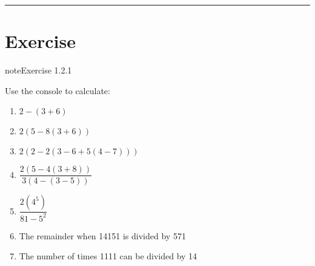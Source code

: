 \documentclass[letterpaper,10pt,english]{jupyterBook}
\begin{document}
\bigskip\hrule\bigskip



\part{Exercise}
\label{\detokenize{_pages/1.1_Basic_arithmetic_operations:exercise}} \label{exercise:python-arithmetic-operations-ex}

\begin{sphinxadmonition}{note}{Exercise 1.2.1}



\sphinxAtStartPar
Use the console to calculate:
\begin{enumerate}
%
\item {} 
\sphinxAtStartPar
\(2 - (3 + 6)\)

\item {} 
\sphinxAtStartPar
\(2(5 - 8(3 + 6))\)

\item {} 
\sphinxAtStartPar
\(2(2 - 2(3 - 6 + 5(4 - 7)))\)

\item {} 
\sphinxAtStartPar
\(\dfrac{2(5 - 4(3 + 8))}{3(4 - (3 - 5))}\)

\item {} 
\sphinxAtStartPar
\(\dfrac{2(4^5)}{81 - 5^2}\)

\item {} 
\sphinxAtStartPar
The remainder when 14151 is divided by 571

\item {} 
\sphinxAtStartPar
The number of times 1111 can be divided by 14

\end{enumerate}
\end{sphinxadmonition}







\renewcommand{\indexname}{Index}
\printindex
\end{document}
